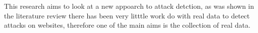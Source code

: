 
This research aims to look at a  new appoarch to attack detction, as was shown in the literature review there has been very litttle work do with real data to detect attacks on websites, therefore one of the main aims is the collection of real data.